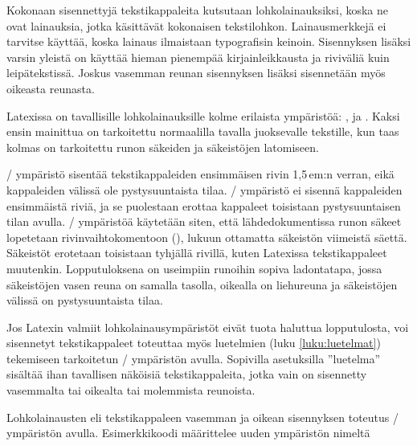Kokonaan sisennettyjä tekstikappaleita kutsutaan lohkolainauksiksi,
koska ne ovat lainauksia, jotka käsittävät kokonaisen tekstilohkon.
Lainausmerkkejä ei tarvitse käyttää, koska lainaus ilmaistaan
typografisin keinoin. Sisennyksen lisäksi varsin yleistä on käyttää
hieman pienempää kirjainleikkausta ja riviväliä kuin leipätekstissä.
Joskus vasemman reunan sisennyksen lisäksi sisennetään myös oikeasta
reunasta.

Latexissa on tavallisille lohkolainauksille kolme erilaista ympäristöä:
,  ja . Kaksi
ensin mainittua on tarkoitettu normaalilla tavalla juoksevalle
tekstille, kun taas kolmas on tarkoitettu runon säkeiden ja säkeistöjen
latomiseen.

\-/ ympäristö sisentää tekstikappaleiden
ensimmäisen rivin 1,5\,em:n verran, eikä kappaleiden välissä ole
pystysuuntaista tilaa. \-/ ympäristö ei sisennä
kappaleiden ensimmäistä riviä, ja se puolestaan erottaa kappaleet
toisistaan pystysuuntaisen tilan avulla. \-/ ympäristöä
käytetään siten, että lähdedokumentissa runon säkeet lopetetaan
rivinvaihtokomentoon (\komento{\keno}), lukuun ottamatta säkeistön
viimeistä säettä. Säkeistöt erotetaan toisistaan tyhjällä rivillä, kuten
Latexissa tekstikappaleet muutenkin. Lopputuloksena on useimpiin
runoihin sopiva ladontatapa, jossa säkeistöjen vasen reuna on samalla
tasolla, oikealla on liehureuna ja säkeistöjen välissä on
pystysuuntaista tilaa.

Jos Latexin valmiit lohkolainausympäristöt eivät tuota haluttua
lopputulosta, voi sisennetyt tekstikappaleet toteuttaa myös luetelmien
(luku \ref{luku:luetelmat}) tekemiseen tarkoitetun \-/
ympäristön avulla. Sopivilla asetuksilla ''luetelma'' sisältää ihan
tavallisen näköisiä tekstikappaleita, jotka vain on sisennetty
vasemmalta tai oikealta tai molemmista reunoista.

\begin{esimerkki*}

\begin{koodilohko}
  \newenvironment{lohkolainaus}{%
    \begin{list}{}{
        \setlength{\leftmargin}{1cm}
        \setlength{\rightmargin}{1cm}
        \setlength{\itemindent}{0bp}
        \setlength{\listparindent}{\parindent}
        \setlength{\parsep}{\parskip}
        \setlength{\topsep}{1em}
        \setlength{\partopsep}{0bp}
      }
    \item\linespread{1}\small
    }{\end{list}}
\end{koodilohko}
\caption{Lohkolainausten eli tekstikappaleen vasemman ja oikean
  sisennyksen toteutus \-/ ympäristön avulla.
  Esimerkkikoodi määrittelee uuden ympäristön nimeltä
  }
\label{esim:vasen_oikea_sisennys}
\end{esimerkki*}

